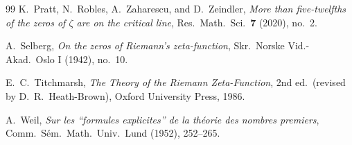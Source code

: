 \documentclass[11pt]{article}
\numberwithin{equation}{section}
\theoremstyle{definition}
\theoremstyle{remark}
\begin{document}
\begin{thebibliography}{99}
 K.~Pratt, N.~Robles, A.~Zaharescu, and
D.~Zeindler, \emph{More than five-twelfths of the zeros of
$\zeta$ are on the critical line}, Res.\ Math.\ Sci.\ \textbf{7}
(2020), no.~2.

 A.~Selberg, \emph{On the zeros of Riemann's
zeta-function}, Skr.\ Norske Vid.-Akad.\ Oslo I (1942), no.~10.

 E.~C.~Titchmarsh, \emph{The Theory of the
Riemann Zeta-Function}, 2nd ed.\ (revised by D.~R.~Heath-Brown),
Oxford University Press, 1986.

 A.~Weil, \emph{Sur les ``formules explicites''
de la th\'eorie des nombres premiers}, Comm.\ S\'em.\ Math.\
Univ.\ Lund (1952), 252--265.

\end{thebibliography}
\end{document}
